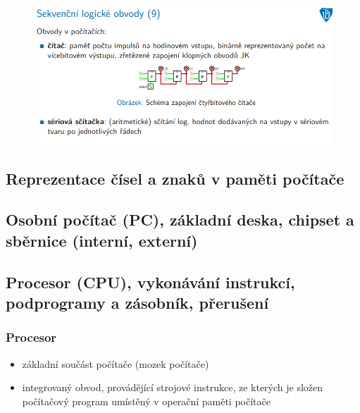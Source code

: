 \documentclass[10pt,a4paper]{article}
\begin{document}
\begin{figure} [h]
	\includegraphics[scale=0.65]{img/prvni_odstavec/otazka2/sekvencni_logicke_obvody9.png}	
\end{figure}



\clearpage
\subsection{Reprezentace čísel a znaků v paměti počítače}


\clearpage
\subsection{Osobní počítač (PC), základní deska, chipset a sběrnice (interní, externí)}


\clearpage
\subsection{Procesor (CPU), vykonávání instrukcí, podprogramy a zásobník, přerušení}

\subsubsection{Procesor}
\begin{itemize}
	\item základní součást počítače (mozek počítače)
	\item integrovaný obvod, provádějící strojové instrukce, ze kterých je složen počítačový program umístěný v operační paměti počítače
\end{itemize}
\end{document}
